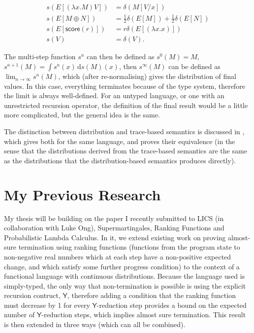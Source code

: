 \documentclass[titlepage]{article}
\newcommand{\tY}{\mathsf{Y}}
\newcommand{\tscore}{\mathsf{score}}
\begin{document}
\begin{align*}
s(E[(\lambda x. M) V]) & = \delta(M[V/x]) \\
s(E[M \oplus N]) & = \frac 1 2 \delta(E[M]) + \frac 1 2 \delta(E[N]) \\
s(E[\tscore(r)]) & = r \delta(E[(\lambda x. x)]) \\
s(V) & = \delta(V).
\end{align*}

The multi-step function $s^n$ can then be defined as $s^0(M) = M$, $s^{n+1}(M) = \int s^n(x)\,\mathrm d s(M)(x)$, then $s^\infty(M)$ can be defined as $\lim_{n \to \infty} s^n(M)$, which (after re-normalising) gives the distribution of final values. In this case, everything terminates because of the type system, therefore the limit is always well-defined. For an untyped language, or one with an unrestricted recursion operator, the definition of the final result would be a little more complicated, but the general idea is the same.

The distinction between distribution and trace-based semantics is discussed in \cite{borgstrom2016lambda}, which gives both for the same language, and proves their equivalence (in the sense that the distributions derived from the trace-based semantics are the same as the distributions that the distribution-based semantics produces directly).


\section{My Previous Research}
My thesis will be building on the paper I recently submitted to LICS (in collaboration with Luke Ong), Supermartingales, Ranking Functions and Probabilistic Lambda Calculus. In it, we extend existing work on proving almost-sure termination using ranking functions (functions from the program state to non-negative real numbers which at each step have a non-positive expected change, and which satisfy some further progress condition) to the context of a functional language with continuous distributions. Because the language used is simply-typed, the only way that non-termination is possible is using the explicit recursion contruct, $\tY$, therefore adding a condition that the ranking function must decrease by 1 for every $\tY$-reduction step provides a bound on the expected number of $\tY$-reduction steps, which implies almost sure termination. This result is then extended in three ways (which can all be combined).
\end{document}
